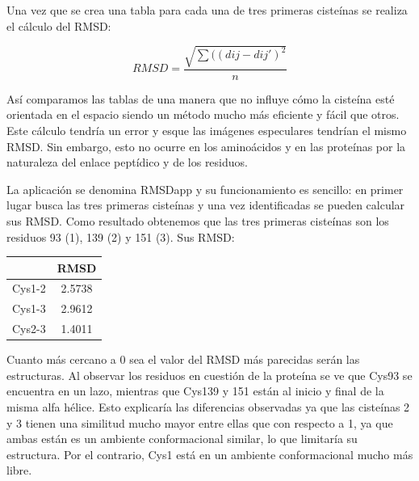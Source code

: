 \documentclass[a4paper,11pt]{report}
\begin{document}
Una vez que se crea una tabla para cada una de tres primeras cisteínas se realiza el cálculo del RMSD:

\begin{equation}
	RMSD= \frac{\sqrt{\sum ((dij-dij')^2}}{n}
\end{equation}

Así comparamos las tablas de una manera que no influye cómo la cisteína esté orientada en el espacio siendo un método mucho más eficiente y fácil que otros.
Este cálculo tendría un error y esque las imágenes especulares tendrían el mismo RMSD. Sin embargo, esto no ocurre en los aminoácidos y en las proteínas por la naturaleza del enlace peptídico y de los residuos.

La aplicación se denomina RMSDapp y su funcionamiento es sencillo: en primer lugar busca las tres primeras cisteínas y una vez identificadas se pueden calcular sus RMSD. Como resultado obtenemos que las tres primeras cisteínas son los residuos 93 (1), 139 (2) y 151 (3). Sus RMSD:
\begin{table} [h]
	\centering
	\begin{tabular}{|c|c|}
		\hline
		&RMSD \\
		\hline
		Cys1-2& 2.5738\\
		Cys1-3& 2.9612\\
		Cys2-3& 1.4011\\
		\hline
	\end{tabular}
\end{table}

Cuanto más cercano a 0 sea el valor del RMSD más parecidas serán las estructuras. Al observar los residuos en cuestión de la proteína se ve que Cys93 se encuentra en un lazo, mientras que Cys139 y 151 están al inicio y final de la misma alfa hélice. Esto explicaría las diferencias observadas ya que las cisteínas 2 y 3 tienen una similitud mucho mayor entre ellas que con respecto a 1, ya que ambas están es un ambiente conformacional similar, lo que limitaría su estructura.
Por el contrario, Cys1 está en un ambiente conformacional mucho más libre.
\end{document}
